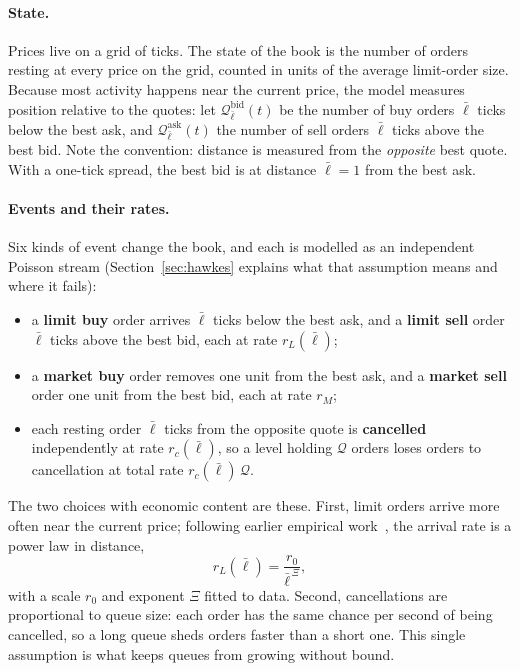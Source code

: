 \paragraph{State.} Prices live on a grid of ticks. The state of the book is the number of orders
resting at every price on the grid, counted in units of the average limit-order size. Because most
activity happens near the current price, the model measures position relative to the quotes: let
$\mathcal{Q}^{\text{bid}}_{\bar\ell}(t)$ be the number of buy orders $\bar\ell$ ticks below the best
ask, and $\mathcal{Q}^{\text{ask}}_{\bar\ell}(t)$ the number of sell orders $\bar\ell$ ticks above the
best bid. Note the convention: distance is measured from the \emph{opposite} best quote. With a
one-tick spread, the best bid is at distance $\bar\ell = 1$ from the best ask.

\paragraph{Events and their rates.} Six kinds of event change the book, and each is modelled as an
independent Poisson stream (Section~\ref{sec:hawkes} explains what that assumption means and where
it fails):
\begin{itemize}[leftmargin=1.5em,itemsep=2pt]
\item a \textbf{limit buy} order arrives $\bar\ell$ ticks below the best ask, and a \textbf{limit sell}
  order $\bar\ell$ ticks above the best bid, each at rate $r_L(\bar\ell)$;
\item a \textbf{market buy} order removes one unit from the best ask, and a \textbf{market sell} order
  one unit from the best bid, each at rate $r_M$;
\item each resting order $\bar\ell$ ticks from the opposite quote is \textbf{cancelled} independently at
  rate $r_c(\bar\ell)$, so a level holding $\mathcal{Q}$ orders loses orders to cancellation at total
  rate $r_c(\bar\ell)\,\mathcal{Q}$.
\end{itemize}
The two choices with economic content are these. First, limit orders arrive more often near the current
price; following earlier empirical work~\citep{bouchaud2002}, the arrival rate is a power law in
distance,
\begin{equation}
  r_L(\bar\ell) = \frac{r_0}{\bar\ell^{\,\Xi}} ,
\end{equation}
with a scale $r_0$ and exponent $\Xi$ fitted to data.
Second, cancellations are proportional to queue size: each order has the same chance per second of
being cancelled, so a long queue sheds orders faster than a short one. This single assumption is what
keeps queues from growing without bound.

